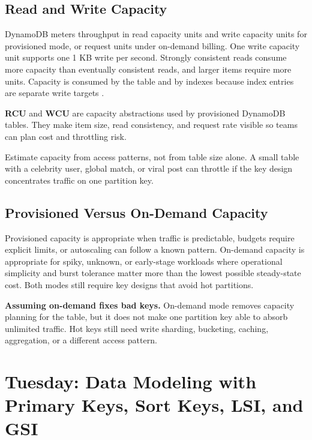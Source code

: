 \subsection{Read and Write Capacity}
DynamoDB meters throughput in read capacity units and write capacity units for provisioned mode, or request units under on-demand billing. One write capacity unit supports one 1 KB write per second. Strongly consistent reads consume more capacity than eventually consistent reads, and larger items require more units. Capacity is consumed by the table and by indexes because index entries are separate write targets \cite{awsDynamoDBCapacity}.
\begin{definitionbox}
\textbf{RCU} and \textbf{WCU} are capacity abstractions used by provisioned DynamoDB tables. They make item size, read consistency, and request rate visible so teams can plan cost and throttling risk.
\end{definitionbox}
\begin{tipbox}
Estimate capacity from access patterns, not from table size alone. A small table with a celebrity user, global match, or viral post can throttle if the key design concentrates traffic on one partition key.
\end{tipbox}

\subsection{Provisioned Versus On-Demand Capacity}
Provisioned capacity is appropriate when traffic is predictable, budgets require explicit limits, or autoscaling can follow a known pattern. On-demand capacity is appropriate for spiky, unknown, or early-stage workloads where operational simplicity and burst tolerance matter more than the lowest possible steady-state cost. Both modes still require key designs that avoid hot partitions.

\begin{pitfall}
\textbf{Assuming on-demand fixes bad keys.} On-demand mode removes capacity planning for the table, but it does not make one partition key able to absorb unlimited traffic. Hot keys still need write sharding, bucketing, caching, aggregation, or a different access pattern.
\end{pitfall}

\section{Tuesday: Data Modeling with Primary Keys, Sort Keys, LSI, and GSI}
